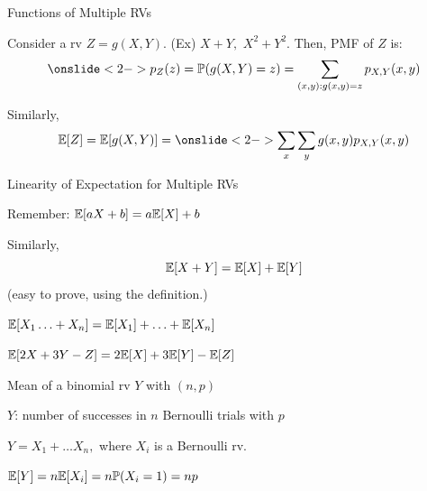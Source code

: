 \begin{frame}{Functions of Multiple RVs}

\plitemsep 0.1in
\bci

\item<1-> Consider a rv $Z = g(X,Y).$ (Ex) $X+Y,$ $X^2 + Y^2.$  Then, PMF of $Z$ is:
$$
\onslide<2->{\pz = \cprob{g(X,Y) = z} = \sum_{(x,y): g(x,y) = z} \pxy}
$$

\item Similarly, 
$$
\expect{Z} = \expect{g(X,Y)} = \onslide<2->{\sum_{x} \sum_{y} g(x,y) \pxy}
$$


\eci 
\end{frame}


\begin{frame}{Linearity of Expectation for Multiple RVs }


{
\plitemsep 0.15in
\bci 

\item Remember: $\mathbb{E}[ aX + b ] = a\mathbb{E}[ X ] +b$

\item<2-> Similarly, 
$$\mathbb{E}[ X+Y ] = \mathbb{E}[ X ] + \mathbb{E}[ Y ]$$ 
(easy to prove, using the definition.)

\bigskip

\bigskip

\item<3-> $\mathbb{E}[ X_1 \ldots + X_n ] = \mathbb{E}[ X_1 ] + \ldots + \mathbb{E}[ X_n ]$

\item<3-> $\mathbb{E}[ 2X + 3Y - Z ] = 2\mathbb{E}[ X ] + 3 \mathbb{E}[ Y ] - \mathbb{E}[ Z ]$
\eci 
}
{
\plitemsep 0.15in
\bci 

\item<4-> \exam Mean of a binomial rv $Y$ with $(n,p)$

\item<4-> $Y$: number of successes in $n$ Bernoulli trials with $p$

\item<5-> $Y = X_1 + \ldots X_n,$ where $X_i$ is a Bernoulli rv. 

\item<5-> $\mathbb{E}[ Y ] = n \mathbb{E}[ X_i ] = n \mathbb{P}( X_i = 1 ) = np$

\eci 

\medskip
{}
}
\end{frame}

